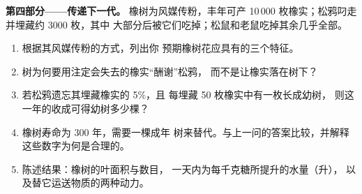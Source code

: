 \begin{problem}
\medskip
\noindent\textbf{第四部分——传递下一代。}
橡树为风媒传粉，丰年可产 10\,000
枚橡实；松鸦叼走并埋藏约 3000 枚，其中
大部分后被它们吃掉；松鼠和老鼠吃掉其余几乎全部。
\begin{enumerate}[resume]
  \item 根据其风媒传粉的方式，列出你
        预期橡树花应具有的三个特征。
  \item 树为何要用注定会失去的橡实“酬谢”松鸦，
        而不是让橡实落在树下？
  \item 若松鸦遗忘其埋藏橡实的 5\%，且
        每埋藏 50 枚橡实中有一枚长成幼树，
        则这一年的收成可得幼树多少棵？
  \item 橡树寿命为 300 年，需要一棵成年
        树来替代。与上一问的答案比较，并解释
        这些数字为何是合理的。
  \item 陈述结果：橡树的叶面积与数目，
        一天内为每千克糖所提升的水量（升），
        以及替它运送物质的两种动力。
\end{enumerate}
\end{problem}
